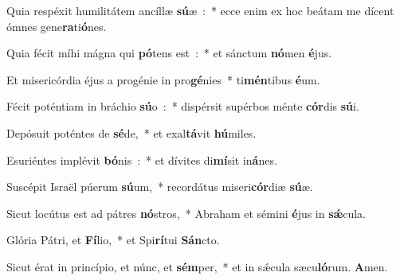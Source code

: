 ﻿\item Quia respéxit humilitátem ancíllæ \textbf{sú}\-æ~:~* ecce enim ex hoc beátam me dícent ómnes gene\textbf{ra}ti\textbf{ó}nes.
\item Quia fécit míhi mágna qui \textbf{pó}\-tens est~:~* et sánctum \textbf{nó}\-men \textbf{é}jus.
\item Et misericórdia éjus a progénie in pro\textbf{gé}\-nies~* ti\textbf{mén}\-tibus \textbf{é}um.
\item Fécit poténtiam in bráchio \textbf{sú}\-o~:~* dispérsit supérbos ménte \textbf{cór}\-dis \textbf{sú}i.
\item Depósuit poténtes de \textbf{sé}\-de,~* et exal\textbf{tá}\-vit \textbf{hú}miles.
\item Esuriéntes implévit \textbf{bó}\-nis~:~* et dívites di\textbf{mí}\-sit in\textbf{á}nes.
\item Suscépit Israël púerum \textbf{sú}\-um,~* recordátus miseri\textbf{cór}\-diæ \textbf{sú}æ.
\item Sicut locútus est ad pátres \textbf{nó}\-stros,~* Abraham et sémini \textbf{é}\-jus in \textbf{sǽ}cula.
\item Glória Pátri, et \textbf{Fí}\-lio,~* et Spi\textbf{rí}\-tui \textbf{Sán}cto.
\item Sicut érat in princípio, et núnc, et \textbf{sém}\-per,~* et in sǽcula sæcu\textbf{ló}\-rum. \textbf{A}men.

